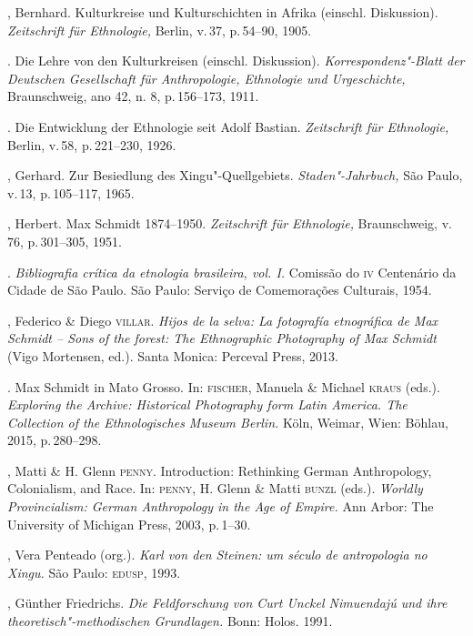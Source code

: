\begin{bibliohedra}
 , Bernhard. Kulturkreise und Kulturschichten in Afrika
 (einschl. Diskussion). \textit{Zeitschrift für Ethnologie,} Berlin, v.\,37, p.\,54--90, 1905.

 \titidem. Die Lehre von den Kulturkreisen (einschl.
 Diskussion). \textit{Korrespondenz"-Blatt der Deutschen Gesellschaft für
 Anthropologie, Ethnologie und Urgeschichte,} Braunschweig, ano 42, n. 8,
 p.\,156--173, 1911.

 \titidem. Die Entwicklung der Ethnologie seit Adolf Bastian.
 \textit{Zeitschrift für Ethnologie,} Berlin, v.\,58, p.\,221--230, 1926.

 , Gerhard. Zur Besiedlung des Xingu"-Quellgebiets.
 \textit{Staden"-Jahrbuch,} São Paulo, v.\,13, p.\,105--117, 1965.

 , Herbert. Max Schmidt 1874--1950. \textit{Zeitschrift für
 Ethnologie,} Braunschweig, v.\,76, p.\,301--305, 1951.

 \titidem. \textit{Bibliografia crítica da etnologia
 brasileira, vol. I.} Comissão do \textsc{iv} Centenário da Cidade de São Paulo.
 São Paulo: Serviço de Comemorações Culturais, 1954.

 , Federico \& Diego \textsc{villar}. \textit{Hijos de la selva: La
 fotografía etnográfica de Max Schmidt -- Sons of the forest: The
 Ethnographic Photography of Max Schmidt} (Vigo Mortensen, ed.). Santa
 Monica: Perceval Press, 2013.

 \titidem. Max Schmidt in Mato Grosso. In: \textsc{fischer}, Manuela
 \& Michael \textsc{kraus} (eds.). \textit{Exploring the Archive: Historical
 Photography form Latin America. The Collection of the Ethnologisches
 Museum Berlin.} Köln, Weimar, Wien: Böhlau, 2015, p.\,280--298.

 , Matti \& H. Glenn \textsc{penny}. Introduction: Rethinking German
 Anthropology, Colonialism, and Race. In: \textsc{penny}, H. Glenn \& Matti \textsc{bunzl}
 (eds.). \textit{Worldly Provincialism: German Anthropology in the Age of
 Empire.} Ann Arbor: The University of Michigan Press, 2003, p.\,1--30.

 , Vera Penteado (org.). \textit{Karl von den Steinen: um século de
 antropologia no Xingu.} São Paulo: \textsc{edusp}, 1993.

 , Günther Friedrichs. \textit{Die Feldforschung von Curt Unckel
 Nimuendajú und ihre theoretisch"-methodischen Grundlagen.} Bonn: Holos.
 1991.


\end{bibliohedra}
